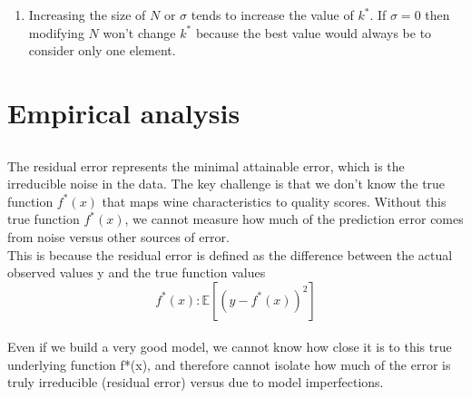 \documentclass[a4paper,10pt]{article}
\begin{document}
\begin{enumerate}


    \item 
    Increasing the size of $N$ or $\sigma$ tends to increase the value of $k^*$. If $\sigma = 0$ then modifying $N$ won't change $k^*$ because the best value would always be to consider only one element.
\end{enumerate}

\section{Empirical analysis}

\subsection{}

The residual error represents the minimal attainable error, which is the irreducible noise in the data. The key challenge is that we don't know the true function $f^*(x)$ that maps wine characteristics to quality scores. Without this true function $f^*(x)$, we cannot measure how much of the prediction error comes from noise versus other sources of error. \\
    
    This is because the residual error is defined as the difference between the actual observed values y and the true function values \[ f^*(x): \mathbb{E}[(y - f^*(x))^2]\]\\
    Even if we build a very good model, we cannot know how close it is to this true underlying function f*(x), and therefore cannot isolate how much of the error is truly irreducible (residual error) versus due to model imperfections. \\
    
\end{document}
